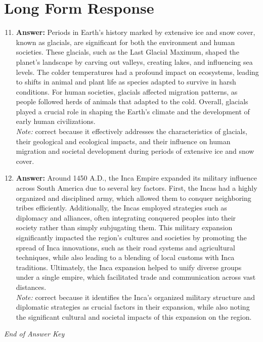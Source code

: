 \documentclass[12pt]{article}
\begin{document}
\section*{Long Form Response}
\begin{enumerate}[label=\arabic*.]
\setcounter{enumi}{10}
\item \textbf{Answer:} Periods in Earth's history marked by extensive ice and snow cover, known as glacials, are significant for both the environment and human societies. These glacials, such as the Last Glacial Maximum, shaped the planet's landscape by carving out valleys, creating lakes, and influencing sea levels. The colder temperatures had a profound impact on ecosystems, leading to shifts in animal and plant life as species adapted to survive in harsh conditions. For human societies, glacials affected migration patterns, as people followed herds of animals that adapted to the cold. Overall, glacials played a crucial role in shaping the Earth's climate and the development of early human civilizations.
\\ \textit{Note:} correct because it effectively addresses the characteristics of glacials, their geological and ecological impacts, and their influence on human migration and societal development during periods of extensive ice and snow cover.
\item \textbf{Answer:} Around 1450 A.D., the Inca Empire expanded its military influence across South America due to several key factors. First, the Incas had a highly organized and disciplined army, which allowed them to conquer neighboring tribes efficiently. Additionally, the Incas employed strategies such as diplomacy and alliances, often integrating conquered peoples into their society rather than simply subjugating them. This military expansion significantly impacted the region's cultures and societies by promoting the spread of Inca innovations, such as their road systems and agricultural techniques, while also leading to a blending of local customs with Inca traditions. Ultimately, the Inca expansion helped to unify diverse groups under a single empire, which facilitated trade and communication across vast distances.
\\ \textit{Note:} correct because it identifies the Inca's organized military structure and diplomatic strategies as crucial factors in their expansion, while also noting the significant cultural and societal impacts of this expansion on the region.
\end{enumerate}

\vfill
\noindent\textit{End of Answer Key}
\end{document}
